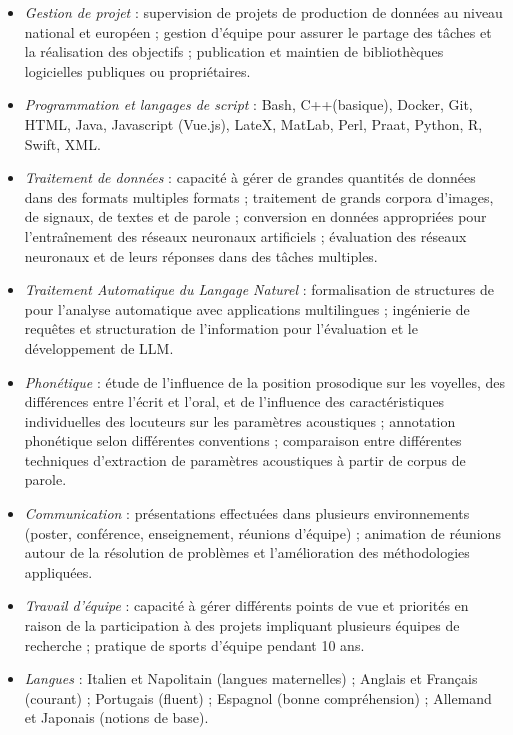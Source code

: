\documentclass[pdftex, a4paper, 11pt, twoside, french]{article}
\begin{document}
\begin{itemize}
\vspace{-0.2em}
	\item[\faTasks] \textit{Gestion de projet} : supervision de projets de production de données au niveau national et européen ; gestion d'équipe pour assurer le partage des tâches et la réalisation des objectifs ; publication et maintien de bibliothèques logicielles publiques ou propriétaires.
\vspace{-0.5em}
	\item[\faLaptopCode] \textit{Programmation et langages de script} : Bash, C++(basique), Docker, Git, HTML, Java, Javascript (Vue.js), LateX, MatLab, Perl, Praat, Python, R, Swift, XML.
\vspace{-0.5em}
	\item[\faTable] \textit{Traitement de données} : capacité à gérer de grandes quantités de données dans des formats multiples formats ; traitement de grands corpora d'images, de signaux, de textes et de parole ;  conversion en données appropriées pour l'entraînement des réseaux neuronaux artificiels ; évaluation des réseaux neuronaux et de leurs réponses dans des tâches multiples.
\vspace{-0.5em}
	\item[\faCenter{spell-check}] \textit{Traitement Automatique du Langage Naturel} : formalisation de structures de pour l'analyse automatique avec applications multilingues ; ingénierie de requêtes et structuration de l'information pour l'évaluation et le développement de LLM.
\vspace{-0.5em}
	\item[\faCommentDots] \textit{Phonétique} : étude de l'influence de la position prosodique sur les voyelles, des différences entre l'écrit et l'oral, et de l'influence des caractéristiques individuelles des locuteurs sur les paramètres acoustiques ; annotation phonétique selon différentes conventions ; comparaison entre différentes techniques d'extraction de paramètres acoustiques à partir de corpus de parole.
\vspace{-0.5em}
	\item[\faFulcrum] \textit{Communication} : présentations effectuées dans plusieurs environnements (poster, conférence, enseignement, réunions d’équipe) ; animation de réunions autour de la résolution de problèmes et l'amélioration des méthodologies appliquées.
\vspace{-0.5em}
	\item[\faRing] \textit{Travail d’équipe} : capacité à gérer différents points de vue et priorités en raison de la participation à des projets impliquant plusieurs équipes de recherche ; pratique de sports d'équipe pendant 10 ans.
\vspace{-0.5em}
	\item[\faLanguage] \textit{Langues} : Italien et Napolitain  (langues maternelles) ; Anglais et Français (courant) ; Portugais (fluent) ; Espagnol (bonne compréhension) ; Allemand et Japonais (notions de base).
\end{itemize}
\vspace{-1.0em}
\end{document}
